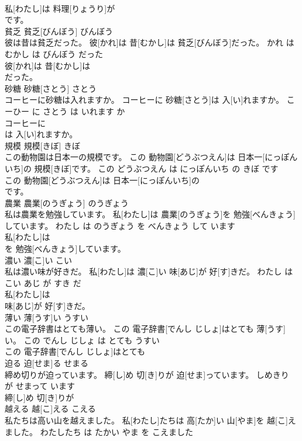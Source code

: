 \documentclass[8pt]{extreport}
\begin{document}
\begin{CJK}{UTF8}{min}
\\	私[わたし]は 料理[りょうり]が
\\	です。			
\\	貧乏	貧乏[びんぼう]	びんぼう	
\\	彼は昔は貧乏だった。	彼[かれ]は 昔[むかし]は 貧乏[びんぼう]だった。	かれ は むかし は びんぼう だった	
\\	彼[かれ]は 昔[むかし]は
\\	だった。			
\\	砂糖	砂糖[さとう]	さとう	
\\	コーヒーに砂糖は入れますか。	コーヒーに 砂糖[さとう]は 入[い]れますか。	こーひー に さとう は いれます か	
\\	コーヒーに
\\	は 入[い]れますか。			
\\	規模	規模[きぼ]	きぼ	
\\	この動物園は日本一の規模です。	この 動物園[どうぶつえん]は 日本一[にっぽんいち]の 規模[きぼ]です。	この どうぶつえん は にっぽんいち の きぼ です	
\\	この 動物園[どうぶつえん]は 日本一[にっぽんいち]の
\\	です。			
\\	農業	農業[のうぎょう]	のうぎょう	
\\	私は農業を勉強しています。	私[わたし]は 農業[のうぎょう]を 勉強[べんきょう]しています。	わたし は のうぎょう を べんきょう して います	
\\	私[わたし]は
\\	を 勉強[べんきょう]しています。			
\\	濃い	濃[こ]い	こい	
\\	私は濃い味が好きだ。	私[わたし]は 濃[こ]い 味[あじ]が 好[す]きだ。	わたし は こい あじ が すき だ	
\\	私[わたし]は
\\	味[あじ]が 好[す]きだ。			
\\	薄い	薄[うす]い	うすい	
\\	この電子辞書はとても薄い。	この 電子辞書[でんし じしょ]はとても 薄[うす]い。	この でんし じしょ は とても うすい	
\\	この 電子辞書[でんし じしょ]はとても
\\	迫る	迫[せま]る	せまる	
\\	締め切りが迫っています。	締[し]め 切[き]りが 迫[せま]っています。	しめきり が せまって います	
\\	締[し]め 切[き]りが
\\	越える	越[こ]える	こえる	
\\	私たちは高い山を越えました。	私[わたし]たちは 高[たか]い 山[やま]を 越[こ]えました。	わたしたち は たかい やま を こえました	

\end{CJK}
\end{document}
